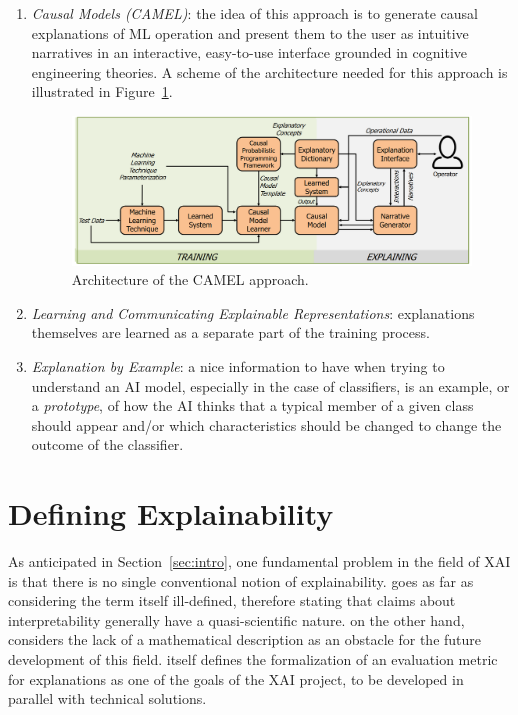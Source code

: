 \documentclass[conference]{IEEEtran}
\newcommand{\cit}[1][]{\todo[tickmarkheight=0.2cm]{cit #1}}
\begin{document}
\begin{enumerate}
    \item \textit{Causal Models (CAMEL)}: \cit the idea of this approach is to generate causal explanations of ML operation and present them to the user as intuitive narratives in an interactive, easy-to-use interface grounded in cognitive engineering theories. A scheme of the architecture needed for this approach is illustrated in Figure~\ref{fig:camel}.

          \begin{figure}[ht!] \centering
              \includegraphics[width=0.9\linewidth]{images/camel.png} \caption{Architecture of the CAMEL approach.} \label{fig:camel} \end{figure}

    \item \textit{Learning and Communicating Explainable Representations}: explanations themselves are learned as a separate part of the training process.

    \item \textit{Explanation by Example}: a nice information to have when
          trying to understand an AI model, especially in the case of
          classifiers, is an example, or a \textit{prototype}, of how the AI
          thinks that a typical member of a given class should appear and/or which characteristics should be changed to change the outcome of the classifier.
\end{enumerate}

\section{Defining Explainability}
\label{sec:explainability}

As anticipated in Section~\ref{sec:intro}, one fundamental problem in
the field of XAI is that there is no single conventional notion of
explainability.
\citet{mythos} goes as far as considering the term itself ill-defined, therefore
stating that claims about interpretability generally have a quasi-scientific
nature. \citet{Giannotti} on the other hand, considers the lack of a mathematical description as an obstacle for the
future development of this field. \citet{DARPA} itself defines the
formalization of an evaluation metric for explanations as one of the goals of
the XAI project, to be developed in parallel with technical solutions.
\end{document}
